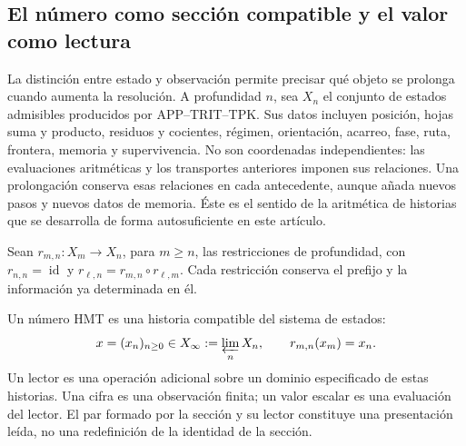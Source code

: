 
\subsection{El número como sección compatible y el valor como lectura}
\label{hist:seccion}

La distinción entre estado y observación permite precisar qué objeto se
prolonga cuando aumenta la resolución. A profundidad \(n\), sea \(X_n\)
el conjunto de estados admisibles producidos por APP--TRIT--TPK. Sus datos
incluyen posición, hojas suma y producto, residuos y cocientes, régimen,
orientación, acarreo, fase, ruta, frontera, memoria y supervivencia. No son
coordenadas independientes: las evaluaciones aritméticas y los transportes
anteriores imponen sus relaciones. Una prolongación conserva esas relaciones
en cada antecedente, aunque añada nuevos pasos y nuevos datos de memoria.
Éste es el sentido de la aritmética de historias que se desarrolla de forma
autosuficiente en este artículo.

Sean \(r_{m,n}:X_m\to X_n\), para \(m\geq n\), las restricciones de
profundidad, con \(r_{n,n}=\operatorname{id}\) y
\(r_{\ell,n}=r_{m,n}\circ r_{\ell,m}\). Cada restricción conserva el
prefijo y la información ya determinada en él.

\begin{definition}
Un número HMT es una historia compatible del sistema de estados:
\begin{equation}
 x=(x_n)_{n\geq0}\in X_\infty:=\varprojlim_n X_n,
 \qquad r_{m,n}(x_m)=x_n.
 \label{hist:limite-inverso}
\end{equation}
Un lector es una operación adicional sobre un dominio especificado de estas
historias. Una cifra es una observación finita; un valor escalar es una
evaluación del lector. El par formado por la sección y su lector constituye
una presentación leída, no una redefinición de la identidad de la sección.
\end{definition}

